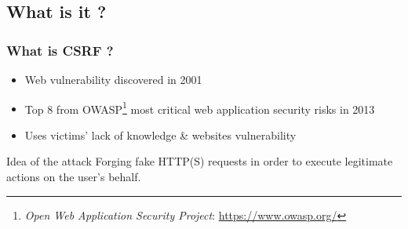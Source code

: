 \documentclass[svgnames]{beamer}
\begin{document}
\subsection{What is it ?}
\begin{frame}
  \frametitle{What is CSRF ?}
  
  \begin{itemize}
   \item Web vulnerability discovered in 2001
   \item Top 8 from OWASP\footnote{\textit{Open Web Application 
       Security Project}: \url{https://www.owasp.org/}} most critical 
   web application security risks in 2013
   \item Uses victims' lack of knowledge \& websites vulnerability
  \end{itemize}
  
  \pause
  
  \begin{block}{Idea of the attack}
    Forging fake HTTP(S) requests in order to execute legitimate actions on the user's behalf.
  \end{block}



\end{frame}

\end{document}
